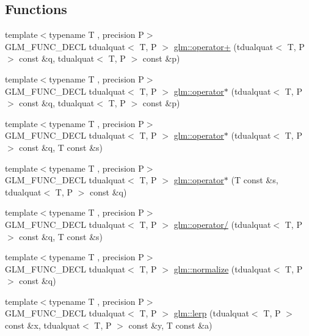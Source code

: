 \subsection*{Functions}
\begin{DoxyCompactItemize}
\item 
{\footnotesize template$<$typename T , precision P$>$ }\\G\+L\+M\+\_\+\+F\+U\+N\+C\+\_\+\+D\+E\+C\+L tdualquat$<$ T, P $>$ \hyperlink{group__gtx__dual__quaternion_ga9d7cfca38c6ff90757705600da3c7972}{glm\+::operator+} (tdualquat$<$ T, P $>$ const \&q, tdualquat$<$ T, P $>$ const \&p)
\item 
{\footnotesize template$<$typename T , precision P$>$ }\\G\+L\+M\+\_\+\+F\+U\+N\+C\+\_\+\+D\+E\+C\+L tdualquat$<$ T, P $>$ \hyperlink{group__gtx__dual__quaternion_ga2c224f87242fe82e8ebc17f01aa51126}{glm\+::operator$\ast$} (tdualquat$<$ T, P $>$ const \&q, tdualquat$<$ T, P $>$ const \&p)
\item 
{\footnotesize template$<$typename T , precision P$>$ }\\G\+L\+M\+\_\+\+F\+U\+N\+C\+\_\+\+D\+E\+C\+L tdualquat$<$ T, P $>$ \hyperlink{group__gtx__dual__quaternion_ga5251d67271c42cf52227b6254f3fc8ed}{glm\+::operator$\ast$} (tdualquat$<$ T, P $>$ const \&q, T const \&s)
\item 
{\footnotesize template$<$typename T , precision P$>$ }\\G\+L\+M\+\_\+\+F\+U\+N\+C\+\_\+\+D\+E\+C\+L tdualquat$<$ T, P $>$ \hyperlink{group__gtx__dual__quaternion_ga0aedf77f3e7d45464501570c28df0ed7}{glm\+::operator$\ast$} (T const \&s, tdualquat$<$ T, P $>$ const \&q)
\item 
{\footnotesize template$<$typename T , precision P$>$ }\\G\+L\+M\+\_\+\+F\+U\+N\+C\+\_\+\+D\+E\+C\+L tdualquat$<$ T, P $>$ \hyperlink{group__gtx__dual__quaternion_gad27b1d064624dd6ff1ecc205616323ba}{glm\+::operator/} (tdualquat$<$ T, P $>$ const \&q, T const \&s)
\item 
{\footnotesize template$<$typename T , precision P$>$ }\\G\+L\+M\+\_\+\+F\+U\+N\+C\+\_\+\+D\+E\+C\+L tdualquat$<$ T, P $>$ \hyperlink{group__gtx__dual__quaternion_ga495818aa48c23e9e730f87a3c337d1d5}{glm\+::normalize} (tdualquat$<$ T, P $>$ const \&q)
\item 
{\footnotesize template$<$typename T , precision P$>$ }\\G\+L\+M\+\_\+\+F\+U\+N\+C\+\_\+\+D\+E\+C\+L tdualquat$<$ T, P $>$ \hyperlink{group__gtx__dual__quaternion_ga8039b88397ca09275be924a26a806a59}{glm\+::lerp} (tdualquat$<$ T, P $>$ const \&x, tdualquat$<$ T, P $>$ const \&y, T const \&a)

\end{DoxyCompactItemize}
